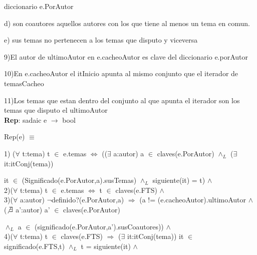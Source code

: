 \documentclass{article}
\begin{document}
\hspace{1cm} diccionario e.PorAutor

\hspace{1cm} d) son coautores aquellos autores con los que tiene al menos un tema en comun.

\hspace{1cm} e) sus temas no pertenecen a los temas que disputo y viceversa 

\hspace{0.5cm}9)El autor de ultimoAutor en e.cacheoAutor es clave del diccionario e.porAutor

\hspace{0.5cm}10)En e.cacheoAutor el itInicio apunta al mismo conjunto que el iterador de temasCacheo
 
\hspace{0.5cm}11)Los temas que estan dentro del conjunto al que apunta el iterador son los temas que disputo el ultimoAutor
\\


\hspace{0.5cm} \textbf{Rep}: sadaic e $\rightarrow$ bool 

\hspace{0.5cm} Rep(e) $\equiv$

\hspace{1cm}1) ($\forall$ t:tema) t $\in$ e.temas $\Leftrightarrow$ (($\exists$ a:autor) a $\in$ claves(e.PorAutor) $\wedge_{L}$ ($\exists$ it:itConj(tema)) 

\hspace{1cm} it $\in$ (Significado(e.PorAutor,a).susTemas) $\wedge_{L}$ siguiente(it) = t) $\wedge$
\\

\hspace{1cm}2)($\forall$ t:tema) t $\in$ e.temas $\Leftrightarrow$ t $\in$ claves(e.FTS) $\wedge$ 
\\

\hspace{1cm}3)($\forall$ a:autor) $\neg$definido?(e.PorAutor,a) $\Rightarrow$ (a != (e.cacheoAutor).ultimoAutor $\wedge$ ($\not\exists$ a':autor) a' $\in$ claves(e.PorAutor)

\hspace{1cm}$\wedge_{L}$ a $\in$ (significado(e.PorAutor,a').susCoautores)) $\wedge$
\\

\hspace{1cm}4)($\forall$ t:tema) t $\in$ claves(e.FTS) $\Rightarrow$ ($\exists$ it:itConj(tema)) it $\in$ significado(e.FTS,t) $\wedge_{L}$ t = siguiente(it) $\wedge$
\\
\end{document}
